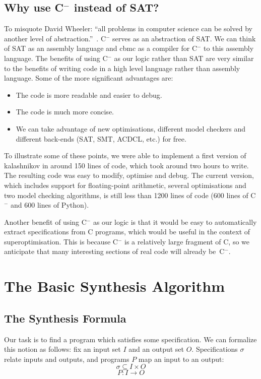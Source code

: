 \documentclass[a4paper]{llncs}
\newcommand{\newC}{C$^-$\xspace}
\begin{document}
\subsection{Why use \newC instead of SAT?}
To misquote David Wheeler: ``all problems in computer science can be solved by
another level of abstraction.''~\cite{beautiful-code}.  \newC serves as
an abstraction of SAT.  We can think of SAT as an assembly language and
{\sc cbmc} as a compiler for \newC to this assembly language.  The benefits
of using \newC as our logic rather than SAT are very similar to the benefits of
writing code in a high level language rather than assembly language.
Some of the more significant advantages are:

\begin{itemize}
 \item The code is more readable and easier to debug.
 \item The code is much more concise.
 \item We can take advantage of new optimisations, different model
 checkers and different back-ends (SAT, SMT, ACDCL, etc.) for free.
\end{itemize}

To illustrate some of these points, we were able to implement a first
version of {\sc kalashnikov} in around 150 lines of code, which took around
two hours to write.  The resulting code was easy to modify, optimise and
debug.  The current version, which includes support for floating-point
arithmetic, several optimisations and two model checking algorithms, is
still less than 1200 lines of code (600 lines of \newC and 600 lines of
Python).

Another benefit of using \newC as our logic is that it would be easy to
automatically extract specifications from C programs, which would be
useful in the context of superoptimisation.  This is because \newC is
a relatively large fragment of C, so we anticipate that many interesting
sections of real code will already be~\newC.

\section{The Basic Synthesis Algorithm}
\label{sec:algorithm}

\subsection{The Synthesis Formula}

Our task is to find a program which satisfies some specification.  We can formalize this
notion as follows: fix an input set $I$ and an output set $O$.  Specifications $\sigma$
relate inputs and outputs, and programs $P$ map an input to an output:
%
$$ \sigma \subseteq I \times O $$
$$ P : I \rightarrow O$$
\end{document}
